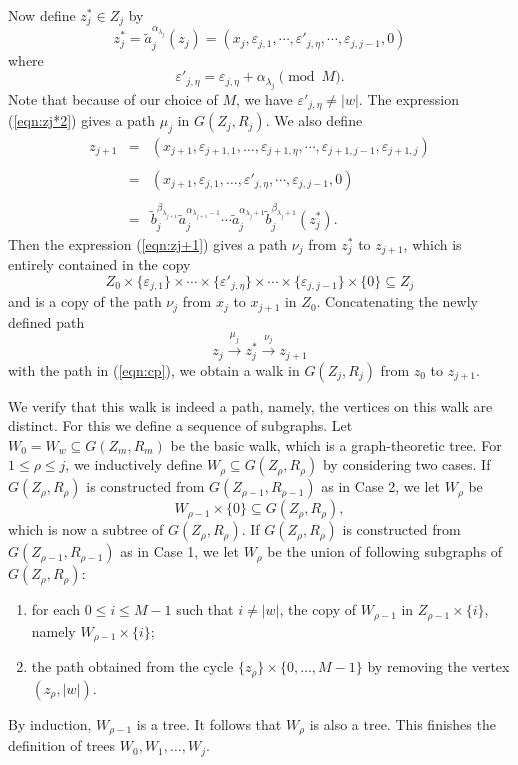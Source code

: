\documentclass[11pt]{amsart}
\theoremstyle{definition}
\theoremstyle{definition}
\numberwithin{equation}{section}
\begin{document}
Now define $z_j^*\in Z_j$ by
\begin{equation}\label{eqn:zj*2} z_j^*=\tilde{a}_j^{\alpha_{\lambda_j}}(z_j)=(x_j, \varepsilon_{j,1}, \cdots, \varepsilon'_{j,\eta}, \cdots, \varepsilon_{j,j-1}, 0) \end{equation}
where
$$\varepsilon'_{j, \eta}=\varepsilon_{j, \eta}+\alpha_{\lambda_j}\pmod{M}. $$
Note that because of our choice of $M$, we have $\varepsilon'_{j, \eta}\neq |w|$. The expression (\ref{eqn:zj*2}) gives a path $\mu_j$ in $G(Z_j, R_j)$. We also define
\begin{equation}\label{eqn:zj+1} \begin{array}{rcl}
z_{j+1}&=&(x_{j+1}, \varepsilon_{j+1,1}, \dots,  \varepsilon_{j+1,\eta}, \cdots, \varepsilon_{j+1, j-1},\varepsilon_{j+1,j}) \\ \\
&=&(x_{j+1}, \varepsilon_{j,1}, \dots,  \varepsilon'_{j,\eta}, \cdots, \varepsilon_{j, j-1},0) \\ \\
&=&\tilde{b}_j^{\beta_{\lambda_{j+1}}}\tilde{a}_j^{\alpha_{\lambda_{j+1}-1}}\cdots\tilde{a}_j^{\alpha_{\lambda_{j}+1}}\tilde{b}_j^{\beta_{\lambda_{j}+1}}(z_j^*). 
\end{array}\end{equation}
Then the expression (\ref{eqn:zj+1}) gives a path $\nu_j$ from $z_j^*$ to $z_{j+1}$, which is entirely contained in the copy
$$ Z_0\times \{\varepsilon_{j,1}\}\times \cdots\times \{\varepsilon'_{j,\eta}\}\times  \cdots\times\{ \varepsilon_{j, j-1}\}\times \{0\}\subseteq Z_j $$
and is a copy of the path $\nu_j$ from $x_j$ to $x_{j+1}$ in $Z_0$. Concatenating the newly defined path
$$ z_j\stackrel{\mu_j}{\longrightarrow} z_j^*\stackrel{\nu_j}{\longrightarrow} z_{j+1} $$
with the path in (\ref{eqn:cp}), we obtain a walk in $G(Z_j, R_j)$ from $z_0$ to $z_{j+1}$. 

We verify that this walk is indeed a path, namely, the vertices on this walk are distinct. For this we define a sequence of subgraphs. Let $W_0=W_w\subseteq G(Z_m, R_m)$ be the basic walk, which is a graph-theoretic tree. For $1\leq \rho\leq j$, we inductively define $W_\rho\subseteq G(Z_\rho, R_\rho)$ by considering two cases.  If $G(Z_{\rho}, R_{\rho})$ is constructed from $G(Z_{\rho-1}, R_{\rho-1})$ as in Case 2, we let $W_\rho$ be 
$$ W_{\rho-1}\times\{0\}\subseteq G(Z_{\rho}, R_\rho), $$
which is now a subtree of $G(Z_{\rho}, R_{\rho})$. If $G(Z_{\rho}, R_{\rho})$ is constructed from $G(Z_{\rho-1}, R_{\rho-1})$ as in Case 1, we let $W_\rho$ be the union of following subgraphs of $G(Z_\rho, R_\rho)$:
\begin{enumerate}
\item[(a)] for each $0\leq i\leq M-1$ such that $i\neq |w|$, the copy of $W_{\rho-1}$ in $Z_{\rho-1}\times \{i\}$, namely $W_{\rho-1}\times\{i\}$;
\item[(b)] the path obtained from the cycle $\{z_\rho\}\times \{0, \dots, M-1\}$ by removing the vertex $(z_\rho, |w|)$.
\end{enumerate}
By induction, $W_{\rho-1}$ is a tree. It follows that $W_\rho$ is also a tree. This finishes the definition of trees $W_0, W_1, \dots, W_j$. 
\end{document}

